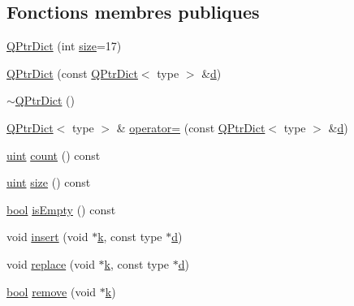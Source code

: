 \subsection*{Fonctions membres publiques}
\begin{DoxyCompactItemize}
\item 
\hyperlink{class_q_ptr_dict_a6dbf690e5fb7083fb2bb70a5b673aaf2}{Q\+Ptr\+Dict} (int \hyperlink{class_q_ptr_dict_a3a840f387de3ce7d1aa898d7dd397086}{size}=17)
\item 
\hyperlink{class_q_ptr_dict_a639ceaa1715d926e0c962bafb7443f22}{Q\+Ptr\+Dict} (const \hyperlink{class_q_ptr_dict}{Q\+Ptr\+Dict}$<$ type $>$ \&\hyperlink{060__command__switch_8tcl_af43f4b1f0064a33b2d662af9f06d3a00}{d})
\item 
\hyperlink{class_q_ptr_dict_a089e07bd483a2c46abfb8621581efb8d}{$\sim$\+Q\+Ptr\+Dict} ()
\item 
\hyperlink{class_q_ptr_dict}{Q\+Ptr\+Dict}$<$ type $>$ \& \hyperlink{class_q_ptr_dict_a3614d22bfa7f747e26f4e60c4e8d8196}{operator=} (const \hyperlink{class_q_ptr_dict}{Q\+Ptr\+Dict}$<$ type $>$ \&\hyperlink{060__command__switch_8tcl_af43f4b1f0064a33b2d662af9f06d3a00}{d})
\item 
\hyperlink{qglobal_8h_a4d3943ddea65db7163a58e6c7e8df95a}{uint} \hyperlink{class_q_ptr_dict_aafdb164d71e44d00d0fa107c92b1b929}{count} () const 
\item 
\hyperlink{qglobal_8h_a4d3943ddea65db7163a58e6c7e8df95a}{uint} \hyperlink{class_q_ptr_dict_a3a840f387de3ce7d1aa898d7dd397086}{size} () const 
\item 
\hyperlink{qglobal_8h_a1062901a7428fdd9c7f180f5e01ea056}{bool} \hyperlink{class_q_ptr_dict_a01f6fc53744467a909d3784e92feda48}{is\+Empty} () const 
\item 
void \hyperlink{class_q_ptr_dict_aea09cd919722fc6ec9934bc75cf5d3c0}{insert} (void $\ast$\hyperlink{060__command__switch_8tcl_a20363f854eb4098a446733d63d34dbc1}{k}, const type $\ast$\hyperlink{060__command__switch_8tcl_af43f4b1f0064a33b2d662af9f06d3a00}{d})
\item 
void \hyperlink{class_q_ptr_dict_a29fcd4c7d0231b758b8a32f748cf2998}{replace} (void $\ast$\hyperlink{060__command__switch_8tcl_a20363f854eb4098a446733d63d34dbc1}{k}, const type $\ast$\hyperlink{060__command__switch_8tcl_af43f4b1f0064a33b2d662af9f06d3a00}{d})
\item 
\hyperlink{qglobal_8h_a1062901a7428fdd9c7f180f5e01ea056}{bool} \hyperlink{class_q_ptr_dict_a04d7a5fbb931195947fabc6c7aecbc7a}{remove} (void $\ast$\hyperlink{060__command__switch_8tcl_a20363f854eb4098a446733d63d34dbc1}{k})

\end{DoxyCompactItemize}
